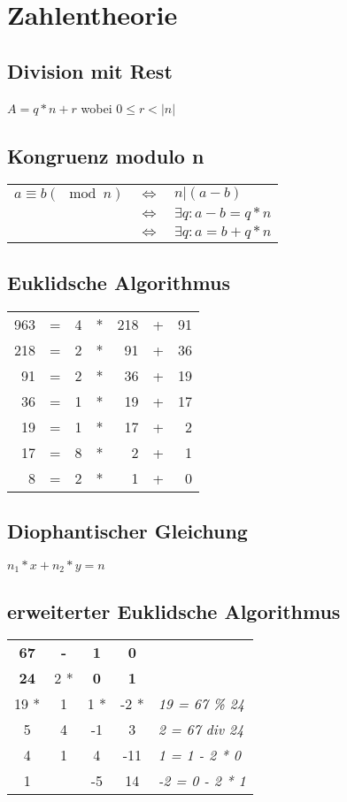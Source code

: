 \section{Zahlentheorie}

\subsection{Division mit Rest}
$ A = q * n + r$ wobei $ 0 \leq r < |n|$

\subsection{Kongruenz modulo n}
\begin{tabular}{lll}
    $ a \equiv b (\mod n)$ & $\iff$ & $n|(a - b)$ \\
    & $\iff$ & $\exists q : a-b = q * n$ \\
    & $\iff$ & $\exists q : a = b + q * n$ \\
\end{tabular}

\subsection{Euklidsche Algorithmus}
\begin{tabular}{rcrcrcr}
    963 & = & 4 & * & 218 & + & 91 \\
    218 & = & 2 & * & 91 & + & 36 \\
    91 & = & 2 & * & 36 & + & 19 \\
    36 & = & 1 & * & 19 & + & 17 \\
    19 & = & 1 & * & 17 & + & 2 \\
    17 & = & 8 & * & 2 & + & 1 \\
    8 & = & 2 & * & 1 & + & 0 \\
\end{tabular}

\subsection{Diophantischer Gleichung}
$n_1 * x + n_2 * y = n$

\subsection{erweiterter Euklidsche Algorithmus}
\begin{tabular}{ccccl}
    \textbf{67} & \textbf{-} & \textbf{1} & \textbf{0} & \\
    \textbf{24} & 2 * & \textbf{0} & \textbf{1} & \\
    19 * & 1 & 1 * & -2 * & \textit{19 = 67 \% 24} \\
    5 & 4 & -1 & 3 & \textit{2 = 67 div 24} \\
    4 & 1 & 4 & -11 & \textit{1 = 1 - 2 * 0} \\
    1 & & -5 & 14 & \textit{-2 = 0 - 2 * 1} \\
\end{tabular} \newline

